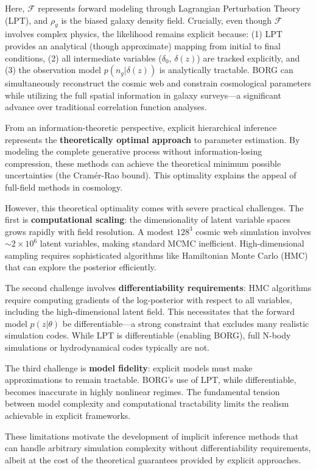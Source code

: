 \documentclass[11pt,a4paper]{article}
\theoremstyle{definition}
\begin{document}
Here, $\mathcal{F}$ represents forward modeling through Lagrangian Perturbation Theory (LPT), and $\rho_g$ is the biased galaxy density field. Crucially, even though $\mathcal{F}$ involves complex physics, the likelihood remains explicit because: (1) LPT provides an analytical (though approximate) mapping from initial to final conditions, (2) all intermediate variables ($\delta_0$, $\delta(z)$) are tracked explicitly, and (3) the observation model $p(n_g|\delta(z))$ is analytically tractable. BORG can simultaneously reconstruct the cosmic web and constrain cosmological parameters while utilizing the full spatial information in galaxy surveys—a significant advance over traditional correlation function analyses.

From an information-theoretic perspective, explicit hierarchical inference represents the \textbf{theoretically optimal approach} to parameter estimation. By modeling the complete generative process without information-losing compression, these methods can achieve the theoretical minimum possible uncertainties (the Cramér-Rao bound). This optimality explains the appeal of full-field methods in cosmology.

However, this theoretical optimality comes with severe practical challenges. The first is \textbf{computational scaling}: the dimensionality of latent variable spaces grows rapidly with field resolution. A modest $128^3$ cosmic web simulation involves $\sim 2 \times 10^6$ latent variables, making standard MCMC inefficient. High-dimensional sampling requires sophisticated algorithms like Hamiltonian Monte Carlo (HMC) that can explore the posterior efficiently.

The second challenge involves \textbf{differentiability requirements}: HMC algorithms require computing gradients of the log-posterior with respect to all variables, including the high-dimensional latent field. This necessitates that the forward model $p(z|\theta)$ be differentiable—a strong constraint that excludes many realistic simulation codes. While LPT is differentiable (enabling BORG), full N-body simulations or hydrodynamical codes typically are not.

The third challenge is \textbf{model fidelity}: explicit models must make approximations to remain tractable. BORG's use of LPT, while differentiable, becomes inaccurate in highly nonlinear regimes. The fundamental tension between model complexity and computational tractability limits the realism achievable in explicit frameworks.

These limitations motivate the development of implicit inference methods that can handle arbitrary simulation complexity without differentiability requirements, albeit at the cost of the theoretical guarantees provided by explicit approaches.
\end{document}
